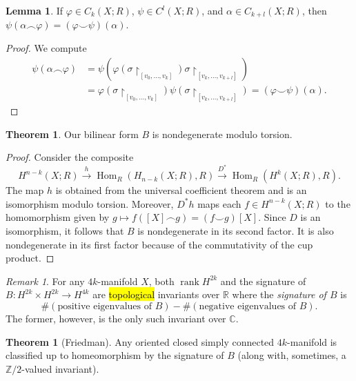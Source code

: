 \documentclass[10pt,letterpaper,cm]{nupset}
\theoremstyle{definition}
\theoremstyle{theorem}
\newtheorem{theorem}[definition]{Theorem}
\newtheorem{lemma}[definition]{Lemma}
\theoremstyle{remark}
\newtheorem{remark}[definition]{Remark}
\newcommand{\C}{\mathbb C}
\newcommand{\R}{\mathbb{R}}
\newcommand{\Z}{\mathbb Z}
\newcommand{\1}{\mathbb{1}}
\newcommand{\0}{\vec 0}
\DeclareMathOperator{\rnk}{rank}
\begin{document}
\begin{lemma}
If $\varphi \in C_k(X; R)$, $\psi \in C^l(X; R)$, and $\alpha \in C_{k+l}(X; R)$, then $\psi(\alpha \frown \varphi) = \left(\varphi \smile \psi\right)(\alpha)$.
\end{lemma}
\begin{proof}
We compute
\begin{align*}
\psi(\alpha \frown \varphi) & = \psi(\varphi(\sigma \restriction_{\left[v_0, \ldots, v_k\right]})\sigma \restriction_{[v_k, \ldots, v_{k+l}]})
\\  & =  \varphi(\sigma \restriction_{\left[v_0, \ldots, v_k\right]})\psi(\sigma \restriction_{[v_k, \ldots, v_{k+l}]}) =  (\varphi \smile \psi)(\alpha)
.\end{align*}
\end{proof}

\begin{theorem}
Our bilinear form $B$ is nondegenerate modulo torsion.
\end{theorem}
\begin{proof}
Consider the composite $$H^{n-k}(X ; R) \stackrel{h}{\longrightarrow} \operatorname{Hom}_{R}\left(H_{n-k}(X ; R), R\right) \stackrel{D^{*}}{\longrightarrow} \operatorname{Hom}_{R}\left(H^{k}(X ; R), R\right).$$ The map $h$ is obtained from the universal coefficient theorem and is an isomorphism modulo torsion. Moreover, $D^{\ast}{h}$ maps each $f \in H^{n-k}(X;R)$ to the homomorphism given by $g \mapsto f([X] \frown g) = \left(f\smile g\right)[X]$. Since $D$ is an isomorphism, it follows that $B$ is nondegenerate in its second factor. It is also nondegenerate in its first factor because of the commutativity of the cup product. 
\end{proof}


\begin{remark}
For any $4k$-manifold $X$, both $\rnk{H^{2k}}$ and the signature of $B : H^{2k} \times H^{2k} \to H^{4k}$ are \hl{topological} invariants over $\R$ where the \textit{signature of $B$} is $$\#\left(\text{positive eigenvalues of }B\right) - \#\left(\text{negative eigenvalues of }B\right).$$ The former, however, is the only such invariant over $\C$.
\end{remark}

\begin{theorem}[Friedman]
Any oriented closed simply connected $4k$-manifold is classified up to homeomorphism by the signature of $B$ (along with, sometimes, a $\Z/2$-valued invariant).
\end{theorem}
\end{document}
